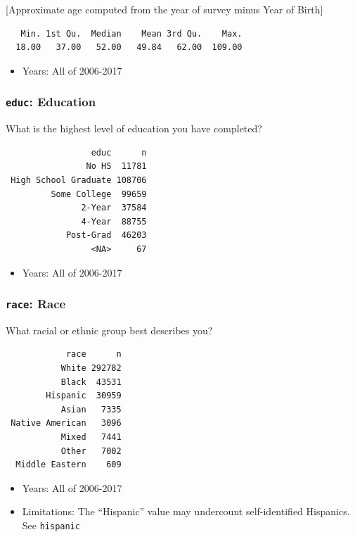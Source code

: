 \documentclass[10pt,article,oneside]{memoir}
\theoremstyle{definition}
\begin{document}
{[}Approximate age computed from the year of survey minus Year of
Birth{]}

\begin{verbatim}
   Min. 1st Qu.  Median    Mean 3rd Qu.    Max. 
  18.00   37.00   52.00   49.84   62.00  109.00 
\end{verbatim}

\begin{itemize}
\tightlist
\item
  Years: All of 2006-2017
\end{itemize}

\subsubsection{\texorpdfstring{\texttt{educ}:
Education}{educ: Education}}\label{educ-education}

What is the highest level of education you have completed?

\begin{verbatim}
                 educ      n
                No HS  11781
 High School Graduate 108706
         Some College  99659
               2-Year  37584
               4-Year  88755
            Post-Grad  46203
                 <NA>     67
\end{verbatim}

\begin{itemize}
\tightlist
\item
  Years: All of 2006-2017
\end{itemize}

\subsubsection{\texorpdfstring{\texttt{race}:
Race}{race: Race}}\label{race-race}

What racial or ethnic group best describes you?

\begin{verbatim}
            race      n
           White 292782
           Black  43531
        Hispanic  30959
           Asian   7335
 Native American   3096
           Mixed   7441
           Other   7002
  Middle Eastern    609
\end{verbatim}

\begin{itemize}
\tightlist
\item
  Years: All of 2006-2017
\item
  Limitations: The ``Hispanic'' value may undercount self-identified
  Hispanics. See \texttt{hispanic}
\end{itemize}
\end{document}
